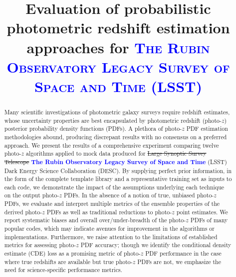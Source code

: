 \documentclass[\docopts]{\docclass}
\newcommand{\boldblue}[1]{{\bf \textcolor{blue}{#1}}}
\begin{document}

\title[Photo-z estimation approaches for LSST]{Evaluation of probabilistic photometric redshift estimation approaches for \boldblue{ \textsc{The Rubin Observatory Legacy Survey of Space and Time} (LSST)}}

\maketitlepre

\begin{abstract}

Many scientific investigations of photometric galaxy surveys require redshift estimates, whose uncertainty properties are best encapsulated by photometric redshift (photo-$z$) posterior probability density functions (PDFs).
A plethora of photo-$z$ PDF estimation methodologies abound, producing discrepant results with no consensus on a preferred approach.
We present the results of a comprehensive experiment comparing twelve photo-$z$ algorithms applied to mock data produced for \sout{Large Synoptic Survey Telescope} \boldblue{The Rubin Observatory Legacy Survey of Space and Time} (\textsc{LSST}) Dark Energy Science Collaboration (\textsc{DESC}).
By supplying perfect prior information, in the form of the complete template library and a representative training set as inputs to each code, we demonstrate the impact of the assumptions underlying each technique on the output photo-$z$ PDFs.
In the absence of a notion of true, unbiased photo-$z$ PDFs, we evaluate and interpret multiple metrics of the ensemble properties of the derived photo-$z$ PDFs as well as traditional reductions to photo-$z$ point estimates.
We report systematic biases and overall over/under-breadth of the photo-$z$ PDFs of many popular codes, which may indicate avenues for improvement in the algorithms or implementations.
Furthermore, we raise attention to the limitations of established metrics for assessing photo-$z$ PDF accuracy; though we identify the conditional density estimate (CDE) loss as a promising metric of photo-$z$ PDF performance in the case where true redshifts are available but true photo-$z$ PDFs are not, we emphasize the need for science-specific performance metrics.

\end{abstract}


\maketitlepost

\end{document}
